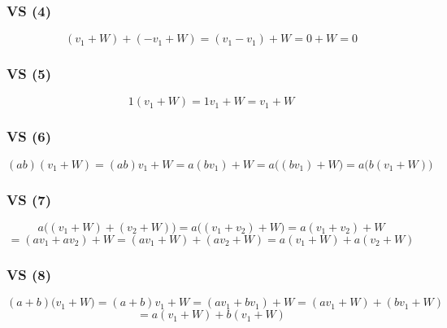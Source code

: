\documentclass{article}
\begin{document}
\subsubsection*{VS (4)}

\begin{equation*}
    (v_{1} + W) + (-v_{1} + W) = (v_{1} - v_{1}) + W = 0 + W = 0
\end{equation*}

\subsubsection*{VS (5)}

\begin{equation*}
    1(v_{1} + W) = 1v_{1} + W = v_{1} + W
\end{equation*}

\subsubsection*{VS (6)}

\begin{equation*}
    (ab)(v_{1} + W) = (ab)v_{1} + W = a(bv_{1}) + W = a\Big( (bv_{1}) + W \Big) = a\Big( b(v_{1} + W) \Big)
\end{equation*}

\subsubsection*{VS (7)}

\begin{equation*}
    a\Big( (v_{1} + W) + (v_{2} + W) \Big) = a\Big( (v_{1} + v_{2}) + W \Big) = a(v_{1} + v_{2}) + W
\end{equation*}
\begin{equation*}
    = (av_{1} + av_{2}) + W = (av_{1} + W) + (av_{2} + W) = a(v_{1} + W) + a(v_{2} + W)
\end{equation*}

\subsubsection*{VS (8)}

\begin{equation*}
    (a+b)\Big( v_{1} + W \Big) = (a + b)v_{1} + W = (av_{1} + bv_{1}) + W = (av_{1} + W) + (bv_{1} + W) 
\end{equation*}
\begin{equation*}
    = a(v_{1} + W) + b(v_{1} + W)
\end{equation*}
\end{document}
